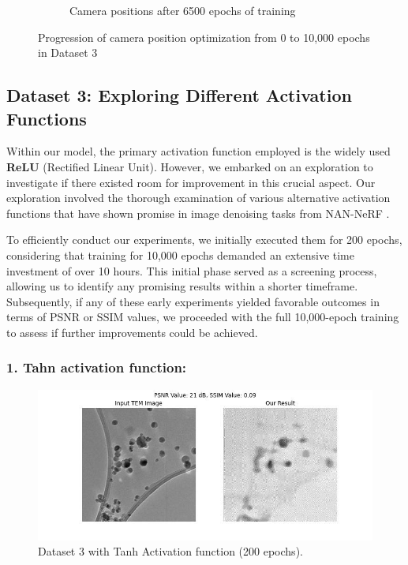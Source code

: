 \begin{figure}[H]
\begin{subfigure}{.47\textwidth}
        \caption{Camera positions after 6500 epochs of training}
        \label{fig:Image4}
    \end{subfigure}
    \caption{Progression of camera position optimization from 0 to 10,000 epochs in Dataset 3}
    \label{fig:Camera Position Optimization}
\end{figure}

\clearpage
\subsection{Dataset 3: Exploring Different Activation Functions}
Within our model, the primary activation function employed is the widely used \textbf{ReLU} (Rectified Linear Unit). However, we embarked on an exploration to investigate if there existed room for improvement in this crucial aspect. Our exploration involved the thorough examination of various alternative activation functions that have shown promise in image denoising tasks from NAN-NeRF \cite{Pearl2022}.

\vspace{10pt}
To efficiently conduct our experiments, we initially executed them for 200 epochs, considering that training for 10,000 epochs demanded an extensive time investment of over 10 hours. This initial phase served as a screening process, allowing us to identify any promising results within a shorter timeframe. Subsequently, if any of these early experiments yielded favorable outcomes in terms of PSNR or SSIM values, we proceeded with the full 10,000-epoch training to assess if further improvements could be achieved.

\subsubsection{1. Tahn activation function:}
\begin{figure}[H]
    \centering
    \includegraphics[width=1\textwidth]{img/Dataset_3_with_200_epochs_Activation_Function.jpg}
    \caption{Dataset 3 with Tanh Activation function (200 epochs).}\label{fig:Dataset_3_with_Tanh_200_epochs.jpg}
\end{figure}

